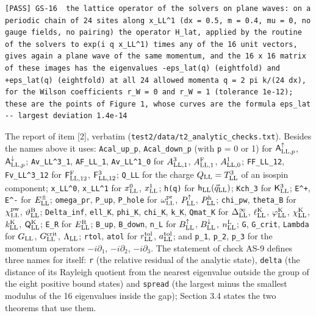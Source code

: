 \documentclass[
  10pt,
]{article}
\begin{document}
\begin{verbatim}
[PASS] GS-16  the lattice operator of the solvers on plane waves: on a periodic chain of 24 sites along x_LL^1 (dx = 0.5, m = 0.4, mu = 0, no gauge fields, no pairing) the operator H_lat, applied by the routine of the solvers to exp(i q x_LL^1) times any of the 16 unit vectors, gives again a plane wave of the same momentum, and the 16 x 16 matrix of these images has the eigenvalues -eps_lat(q) (eightfold) and +eps_lat(q) (eightfold) at all 24 allowed momenta q = 2 pi k/(24 dx), for the Wilson coefficients r_W = 0 and r_W = 1 (tolerance 1e-12); these are the points of Figure 1, whose curves are the formula eps_lat  -- largest deviation 1.4e-14
\end{verbatim}

The report of item {[}2{]}, verbatim
(\texttt{test2/data/t2\_analytic\_checks.txt}). Besides the names above
it uses: \texttt{Acal\_up\_p}, \texttt{Acal\_down\_p} (with \texttt{p} =
0 or 1) for \(\mathsf A^\uparrow_{{\rm LL},p}\),
\(\mathsf A^\downarrow_{{\rm LL},p}\); \texttt{Av\_LL\^{}3\_1},
\texttt{AF\_LL\_1}, \texttt{Av\_LL\^{}1\_0} for \(A^3_{{\rm LL},1}\),
\(A^{\rm F}_{{\rm LL},1}\), \(A^1_{{\rm LL},0}\); \texttt{FF\_LL\_12},
\texttt{Fv\_LL\^{}3\_12} for \(\mathsf F^{\rm F}_{{\rm LL},12}\),
\(\mathsf F^3_{{\rm LL},12}\); \texttt{Q\_LL} for the charge
\(Q_{\rm LL}=T^3_{\rm LL}\) of an isospin component;
\texttt{x\_LL\^{}0}, \texttt{x\_LL\^{}1} for \(x^0_{\rm LL}\),
\(x^1_{\rm LL}\); \texttt{h(q)} for
\(\mathsf h_{\rm LL}(\vec q_{\rm LL})\); \texttt{Kch\_3} for
\(\mathsf K^3_{\rm LL}\); \texttt{E\^{}+}, \texttt{E\^{}-} for
\(E^\pm_{\rm LL}\); \texttt{omega\_pr}, \texttt{P\_up}, \texttt{P\_hole}
for \(\omega^{\rm pr}_{\rm LL}\), \(P^\uparrow_{\rm LL}\),
\(P^{\rm h}_{\rm LL}\); \texttt{chi\_pw}, \texttt{theta\_B} for
\(\chi^{\rm pw}_{\rm LL}\), \(\vartheta^{\rm B}_{\rm LL}\);
\texttt{Delta\_inf}, \texttt{ell\_K}, \texttt{phi\_K}, \texttt{chi\_K},
\texttt{k\_K}, \texttt{Qmat\_K} for \(\Delta^\infty_{\rm LL}\),
\(\ell^{\rm K}_{\rm LL}\), \(\varphi^{\rm K}_{\rm LL}\),
\(\chi^{\rm K}_{\rm LL}\), \(k^{\rm K}_{\rm LL}\),
\(\mathsf Q^{\rm K}_{\rm LL}\); \texttt{E\_R} for
\(E^{\rm R}_{\rm LL}\); \texttt{B\_up}, \texttt{B\_down}, \texttt{n\_L}
for \(B^\uparrow_{\rm LL}\), \(B^\downarrow_{\rm LL}\),
\(n^{\rm L}_{\rm LL}\); \texttt{G}, \texttt{G\_crit}, \texttt{Lambda}
for \(G_{\rm LL}\), \(G^{\rm crit}_{\rm LL}\), \(\Lambda_{\rm LL}\);
\texttt{rtol}, \texttt{atol} for \(r^{\rm tol}_{\rm LL}\),
\(a^{\rm tol}_{\rm LL}\); and \texttt{p\_1}, \texttt{p\_2},
\texttt{p\_3} for the momentum operators \(-i\partial_1\),
\(-i\partial_2\), \(-i\partial_3\). The statement of check AS-9 defines
three names for itself: \texttt{r} (the relative residual of the
analytic state), \texttt{delta} (the distance of its Rayleigh quotient
from the nearest eigenvalue outside the group of the eight positive
bound states) and \texttt{spread} (the largest minus the smallest
modulus of the 16 eigenvalues inside the gap); Section 3.4 states the
two theorems that use them.
\end{document}
